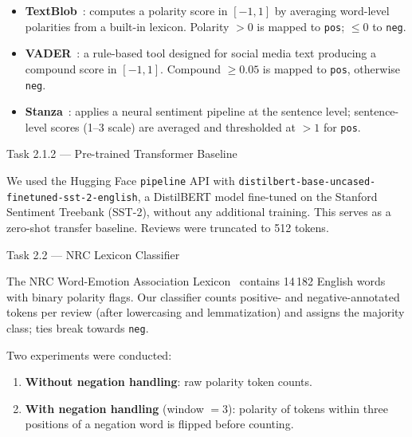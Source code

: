 \documentclass[12pt,reqno,twoside]{amsbook}
\makeatletter
\def\section{\@startsection{section}{1}%
      \z@{.5\linespacing\@plus.7\linespacing}{.25\linespacing}%
      {\normalfont\bfseries\flushleft}}
\theoremstyle{plain}
\numberwithin{equation}{chapter}
\numberwithin{section}{chapter}
\makeatother
\begin{document}
\begin{itemize}[noitemsep]
  \item \textbf{TextBlob}~\cite{textblob}: computes a polarity score in $[-1, 1]$
        by averaging word-level polarities from a built-in lexicon.
        Polarity $> 0$ is mapped to \texttt{pos}; $\leq 0$ to \texttt{neg}.
  \item \textbf{VADER}~\cite{hutto2014}: a rule-based tool designed for social
        media text producing a compound score in $[-1, 1]$.
        Compound $\geq 0.05$ is mapped to \texttt{pos}, otherwise \texttt{neg}.
  \item \textbf{Stanza}~\cite{qi2020}: applies a neural sentiment pipeline at the
        sentence level; sentence-level scores (1--3 scale) are averaged and
        thresholded at $> 1$ for \texttt{pos}.
\end{itemize}

\section{Task 2.1.2 --- Pre-trained Transformer Baseline}

\noindent We used the Hugging Face \texttt{pipeline} API with
\texttt{distilbert-base-uncased-finetuned-sst-2-english}, a DistilBERT model
fine-tuned on the Stanford Sentiment Treebank (SST-2), without any additional
training.
This serves as a zero-shot transfer baseline.
Reviews were truncated to 512 tokens.

\section{Task 2.2 --- NRC Lexicon Classifier}

\noindent The NRC Word-Emotion Association Lexicon~\cite{mohammad2013} contains
14\,182 English words with binary polarity flags.
Our classifier counts positive- and negative-annotated tokens per review (after
lowercasing and lemmatization) and assigns the majority class; ties break towards
\texttt{neg}.

Two experiments were conducted:

\begin{enumerate}[noitemsep]
  \item \textbf{Without negation handling}: raw polarity token counts.
  \item \textbf{With negation handling} (window $= 3$): polarity of tokens within
        three positions of a negation word is flipped before counting.
\end{enumerate}
\end{document}

